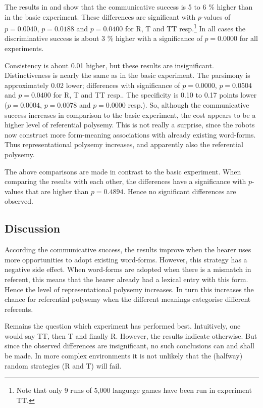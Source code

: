 The results in  and  show that the communicative success is 5 to 6 \% higher than in the basic experiment. These differences are significant with $p$-values of $p=0.0040$, $p=0.0188$ and $p=0.0400$ for R, T and TT resp.\footnote{Note that only 9 runs of 5,000 language games have been run in experiment TT.} In all cases the discriminative success is about 3 \% higher with a significance of $p=0.0000$ for all experiments.

Consistency is about 0.01 higher, but these results are insignificant. Distinctiveness is nearly the same as in the basic experiment. The parsimony is approximately 0.02 lower; differences with significance of $p=0.0000$, $p=0.0504$ and $p=0.0400$ for R, T and TT resp.. The specificity is 0.10 to 0.17 points lower ($p=0.0004$, $p=0.0078$ and $p=0.0000$ resp.). So, although the communicative success increases in comparison to the basic experiment, the cost appears to be a higher level of referential polysemy. This is not really a surprise, since the robots now construct more form-meaning associations with already existing word-forms. Thus representational polysemy increases, and apparently also the referential polysemy.

The above comparisons are made in contrast to the basic experiment. When comparing the results with each other, the differences have a significance with $p$-values that are higher than $p=0.4894$. Hence no significant differences are observed.

\subsection{Discussion}

According the communicative success, the results improve when the hearer uses more opportunities to adopt existing word-forms. However, this strategy has a negative side effect. When word-forms are adopted when there is a mismatch in referent, this means that the hearer already had a lexical entry with this form. Hence the level of representational polysemy increases. In turn this increases the chance for referential polysemy when the different meanings categorise different referents.

Remains the question which experiment has performed best. Intuitively, one would say TT, then T and finally R. However, the results indicate otherwise. But since the observed differences are insignificant, no such conclusions can and shall be made. In more complex environments it is not unlikely that the (halfway) random strategies (R and T) will fail.

